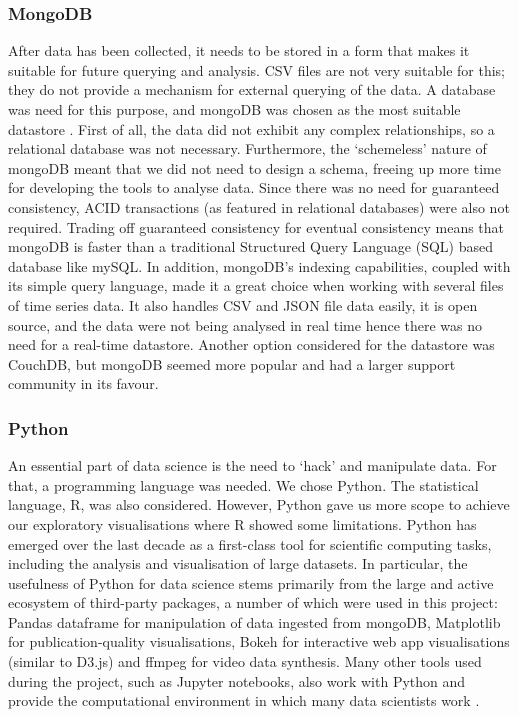 \documentclass[fleqn,10pt]{SelfArx} %
\begin{document}
\subsubsection{MongoDB}
After data has been collected, it needs to be stored in a form that makes it suitable for future  querying and analysis. CSV files are not very suitable for this; they do not provide a mechanism for external querying of the data. A database was need for this purpose, and mongoDB was chosen as the most suitable datastore \cite{mongo2014}. First of all, the data did not exhibit any complex relationships, so a relational database was not necessary. Furthermore, the ‘schemeless’ nature of mongoDB meant that we did not need to design a schema, freeing up more time for developing the tools to analyse data. Since there was no need for guaranteed consistency, ACID transactions (as featured in relational databases) were also not required. Trading off guaranteed consistency for eventual consistency means that mongoDB is faster than a traditional Structured Query Language (SQL) based database like mySQL. In addition, mongoDB’s indexing capabilities, coupled with its simple query language, made it a great choice when working with several files of time series data. It also handles CSV and JSON file data easily, it is open source, and the data were not being analysed in real time hence there was no need for a real-time datastore. Another option considered for the datastore was CouchDB, but mongoDB seemed more popular and had a larger support community in its favour.  \\

\subsubsection{Python}
An essential part of data science is the need to ‘hack’ and manipulate data. For that, a programming language was needed. We chose Python. The statistical language, R, was also considered. However, Python gave us more scope to achieve our exploratory visualisations where R showed some limitations.  Python has emerged over the last decade as a first-class tool for scientific computing tasks, including the analysis and visualisation of large datasets. In particular, the usefulness of Python for data science stems primarily from the large and active ecosystem of third-party packages, a number of which were used in this project: Pandas dataframe for manipulation of data ingested from mongoDB, Matplotlib for publication-quality visualisations, Bokeh for interactive web app visualisations (similar to D3.js) and ffmpeg for video data synthesis. Many other tools used during the project, such as Jupyter notebooks, also work with Python and provide the computational environment in which many data scientists work \cite{Vanderplas17}. \\
\end{document}
